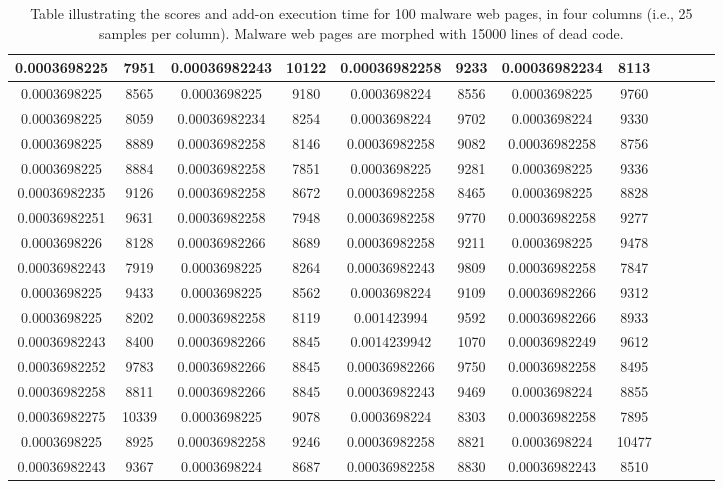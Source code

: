 \begin{table}[h]
\begin{tabular}{|c|c|c|c|c|c|c|c|c|c|c|c|}
\midrule
0.0003698225&7951&0.00036982243&10122&0.00036982258&9233&0.00036982234&8113\\
\midrule
0.0003698225&8565&0.0003698225&9180&0.0003698224&8556&0.0003698225&9760\\
\midrule
0.0003698225&8059&0.00036982234&8254&0.0003698224&9702&0.0003698224&9330\\
\midrule
0.0003698225&8889&0.00036982258&8146&0.00036982258&9082&0.00036982258&8756\\
\midrule
0.0003698225&8884&0.00036982258&7851&0.0003698225&9281&0.0003698225&9336\\
\midrule
0.00036982235&9126&0.00036982258&8672&0.00036982258&8465&0.0003698225&8828\\
\midrule
0.00036982251&9631&0.00036982258&7948&0.00036982258&9770&0.00036982258&9277\\
\midrule
0.0003698226&8128&0.00036982266&8689&0.00036982258&9211&0.0003698225&9478\\
\midrule
0.00036982243&7919&0.0003698225&8264&0.00036982243&9809&0.00036982258&7847\\
\midrule
0.0003698225&9433&0.0003698225&8562&0.0003698224&9109&0.00036982266&9312\\
\midrule
0.0003698225&8202&0.00036982258&8119&0.001423994&9592&0.00036982266&8933\\
\midrule
0.00036982243&8400&0.00036982266&8845&0.0014239942&1070&0.00036982249&9612\\
\midrule
0.00036982252&9783&0.00036982266&8845&0.00036982266&9750&0.00036982258&8495\\
\midrule
0.00036982258&8811&0.00036982266&8845&0.00036982243&9469&0.0003698224&8855\\
\midrule
0.00036982275&10339&0.0003698225&9078&0.0003698224&8303&0.00036982258&7895\\
\midrule
0.0003698225&8925&0.00036982258&9246&0.00036982258&8821&0.0003698224&10477\\
\midrule
0.00036982243&9367&0.0003698224&8687&0.00036982258&8830&0.00036982243&8510\\
\midrule
\end{tabular}
\caption[Scores table of malware web pages]{Table illustrating the scores and add-on execution time for 100 malware web pages, in four columns (i.e., 25 samples per column). Malware web pages are morphed with 15000 lines of dead code. }    \label{tab:m15000table}
\end{table}

